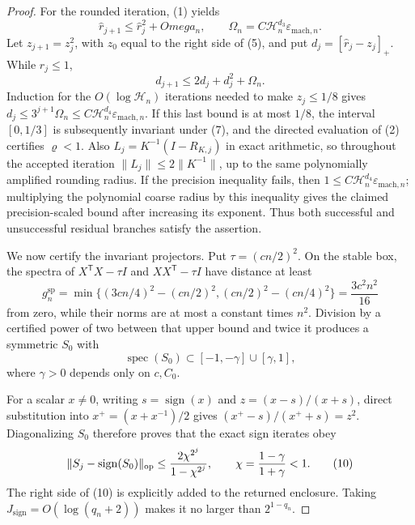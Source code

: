 \documentclass{article}
\begin{document}
\begin{proof}
For the rounded iteration, (1) yields
\[
\widehat r_{j+1}\le \widehat r_j^2+Omega_n,
\qquad
\Omega_n=C\mathcal H_n^{d_3}\varepsilon_{
\mathrm{mach},n}.                                                     \tag{7}
\]
Let \(z_{j+1}=z_j^2\), with \(z_0\) equal to the right side of (5), and put
\(d_j=[\widehat r_j-z_j]_+\).  While \(\widehat r_j\le1\),
\[
d_{j+1}\le2d_j+d_j^2+\Omega_n.
\]
Induction for the \(O(\log\mathcal H_n)\) iterations needed to make
\(z_j\le1/8\) gives
\(d_j\le3^{j+1}\Omega_n\le C\mathcal H_n^{d_4}\varepsilon_{
\mathrm{mach},n}\).  If this last bound is at most \(1/8\), the interval
\([0,1/3]\) is subsequently invariant under (7), and the directed evaluation
of (2) certifies \(\varrho<1\).  Also
\(L_j=K^{-1}(I-R_{K,j})\) in exact arithmetic, so throughout the accepted
iteration \(\|L_j\|\le2\|K^{-1}\|\), up to the same polynomially amplified
rounding radius.  If the precision inequality fails, then
\(1\le C\mathcal H_n^{d_4}\varepsilon_{
\mathrm{mach},n}\); multiplying the polynomial coarse radius by this inequality
gives the claimed precision-scaled bound after increasing its exponent.  Thus
both successful and unsuccessful residual branches satisfy the assertion.

We now certify the invariant projectors.  Put \(\tau=(cn/2)^2\).  On the stable
box, the spectra of \(X^{\mathsf T}X-\tau I\) and
\(XX^{\mathsf T}-\tau I\) have distance at least
\[
g_n^{\mathrm{sp}}
=\min\{(3cn/4)^2-(cn/2)^2,(cn/2)^2-(cn/4)^2\}
=\frac{3c^2n^2}{16}                                                   \tag{8}
\]
from zero, while their norms are at most a constant times \(n^2\).  Division by
a certified power of two between that upper bound and twice it produces a
symmetric \(S_0\) with
\[
\operatorname{spec}(S_0)\subset[-1,-\gamma]\cup[\gamma,1],           \tag{9}
\]
where \(\gamma>0\) depends only on \(c,C_0\).

For a scalar \(x\ne0\), writing \(s=\operatorname{sign}(x)\) and
\(z=(x-s)/(x+s)\), direct substitution into
\(x^+=(x+x^{-1})/2\) gives \((x^+-s)/(x^++s)=z^2\).  Diagonalizing \(S_0\)
therefore proves that the exact sign iterates obey
\[
\|S_j-\operatorname{sign}(S_0)\|_{
\mathrm{op}}
\le {2\chi^{2^j}\over1-\chi^{2^j}},
\qquad \chi={1-\gamma\over1+\gamma}<1.                               \tag{10}
\]
The right side of (10) is explicitly added to the returned enclosure.  Taking
\(J_{
\mathrm{sign}}=O(\log(q_n+2))\) makes it no larger than
\(2^{1-q_n}\).


\end{proof}
\end{document}
